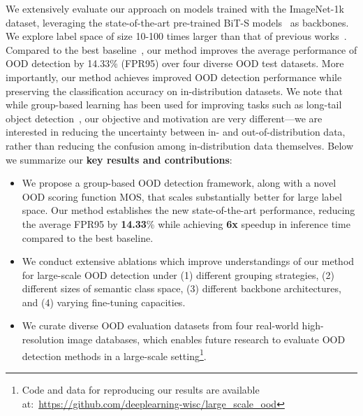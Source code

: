 \documentclass[final]{cvpr}
\begin{document}
We extensively evaluate our approach on models trained with the ImageNet-1k dataset, leveraging the state-of-the-art pre-trained BiT-S models~\cite{kolesnikov2020big} as backbones. We explore label space of size 10-100 times larger than that of previous works~\cite{hendrycks2016baseline,liang2018enhancing,lee2018simple,liu2020energy,chen2020robust-new,hendrycks2018deep}. Compared to the best baseline~\cite{hendrycks2019benchmark}, our method improves the average performance of OOD detection by 14.33\% (FPR95) over four diverse OOD test datasets. 
More importantly, our method achieves improved OOD detection performance while preserving the classification accuracy on in-distribution datasets. We note that while group-based learning has been used for improving tasks such as long-tail object detection~\cite{li2020overcoming}, our objective and motivation are very different---we are interested in reducing the uncertainty between in- and out-of-distribution data, rather than reducing the confusion among in-distribution data themselves. 
Below we summarize our \textbf{key results and contributions}:\vspace{-0.1cm}
\begin{itemize}
\vspace{-0.1cm}
    \item We propose a group-based OOD detection framework, along with a novel OOD scoring function MOS, that scales substantially better for large label space. Our method establishes the new state-of-the-art performance, reducing the average FPR95 by \textbf{14.33}\%  while achieving \textbf{6x} speedup in inference time compared to the best baseline.\vspace{-0.2cm}
    \item We conduct extensive ablations which improve understandings of our method for
large-scale OOD detection under (1) different grouping strategies, (2) different sizes of semantic class space, (3) different backbone architectures, and (4) varying fine-tuning capacities.
 \vspace{-0.2cm}
    \item We curate diverse OOD evaluation datasets from four real-world high-resolution image databases, which enables future research to evaluate OOD detection methods in a large-scale setting\footnote{ Code and data for reproducing our results are available at:~\url{https://github.com/deeplearning-wisc/large_scale_ood}}.
\end{itemize}
\end{document}
